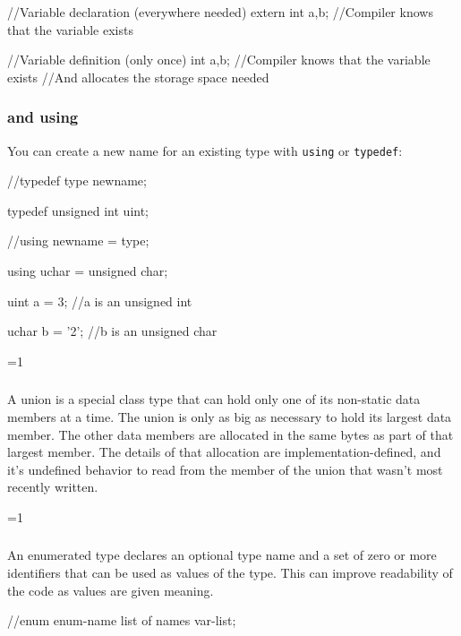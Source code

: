 \documentclass[10pt,a4paper]{scrartcl}
\gdef\conditionmacro{0}
\begin{document}
\begin{multicols*}{2}
\begin{TPCpp}
//Variable declaration (everywhere needed)
extern int a,b; //Compiler knows that the variable exists

//Variable definition (only once)
int a,b; //Compiler knows that the variable exists
         //And allocates the storage space needed
\end{TPCpp}
\fi

\subsubsection{ and using}
\label{sec:TypedefAndUsing}

You can create a new name for an existing type with \verb+using+ or \verb+typedef+:

\begin{TPCpp}
//typedef type newname;

typedef unsigned int uint;

//using newname = type;

using uchar = unsigned char;

uint a = 3; //a is an unsigned int

uchar b = '2'; //b is an unsigned char
\end{TPCpp}

\ifnum\conditionmacro=1
\subsubsection{}
\label{sec:Union}

A union is a special class type that can hold only one of its non-static data members at a time. The union is only as big as necessary to hold its largest data member. The other data members are allocated in the same bytes as part of that largest member. The details of that allocation are implementation-defined, and it's undefined behavior to read from the member of the union that wasn't most recently written.
\fi

\ifnum\conditionmacro=1
\subsubsection{}
\label{sec:Enum}

An enumerated type declares an optional type name and a set of zero or more identifiers that can be used as values of the type. This can improve readability of the code as values are given meaning.

\begin{TPCpp}
//enum enum-name {list of names} var-list;


\end{TPCpp}
\end{multicols*}
\end{document}
